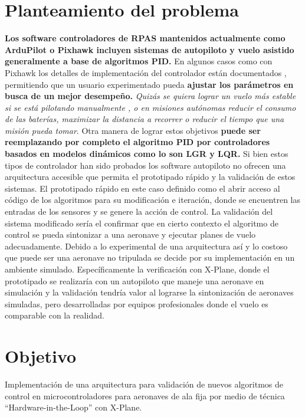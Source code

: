 \section{Planteamiento del problema}

\textbf{Los software controladores de RPAS mantenidos actualmente como ArduPilot o Pixhawk incluyen sistemas de autopiloto y vuelo asistido generalmente a base de algoritmos PID.} En algunos casos como con Pixhawk los detalles de implementación del controlador están documentados \cite{px4-control-diagram}, permitiendo que un usuario experimentado pueda \textbf{ajustar los parámetros en busca de un mejor desempeño.} \emph{Quizás se quiera lograr un vuelo más estable si se está pilotando manualmente \cite{betaflight-pid-tuning}, o en misiones autónomas reducir el consumo de las baterías, maximizar la distancia a recorrer o reducir el tiempo que una misión pueda tomar}. Otra manera de lograr estos objetivos \textbf{puede ser reemplazando por completo el algoritmo PID por controladores basados en modelos dinámicos como lo son LGR y LQR.} Si bien estos tipos de controlador han sido probados \cite{yt-lqr} los software autopiloto no ofrecen una arquitectura accesible que permita el prototipado rápido y la validación de estos sistemas. El prototipado rápido en este caso definido como el abrir acceso al código de los algoritmos para su modificación e iteración, donde se encuentren las entradas de los sensores y se genere la acción de control. La validación del sistema modificado sería el confirmar que en cierto contexto el algoritmo de control se pueda sintonizar a una aeronave y ejecutar planes de vuelo adecuadamente. Debido a lo experimental de una arquitectura así y lo costoso que puede ser una aeronave no tripulada se decide por su implementación en un ambiente simulado. Específicamente la verificación con X-Plane, donde el prototipado se realizaría con un autopiloto que maneje una aeronave en simulación y la validación tendría valor al lograrse la sintonización de aeronaves simuladas, pero desarrolladas por equipos profesionales donde el vuelo es comparable con la realidad.

\section{Objetivo}

Implementación de una arquitectura para validación de nuevos algoritmos de control en microcontroladores para aeronaves de ala fija por medio de técnica ``Hardware-in-the-Loop'' con X-Plane.

